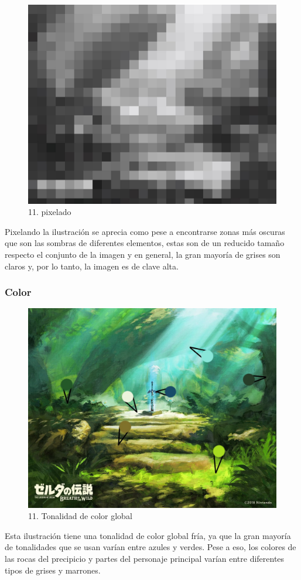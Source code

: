 \documentclass[12pt]{article}
\begin{document}
    \begin{figure}[H]
      \centering
      \includegraphics[scale=0.35]{images/Carlos/12/Pixelart.jpg}
      \caption{\small 11. pixelado}
    \end{figure}
    Pixelando la ilustración se aprecia como pese a encontrarse zonas más oscuras que son las sombras de diferentes elementos, estas son de un reducido tamaño respecto el conjunto de la imagen y en general, la gran mayoría de grises son claros y, por lo tanto, la imagen es de clave alta.

        \subsubsection{Color}
\begin{figure}[H]
      \centering
      \includegraphics[scale=0.35]{images/Carlos/12/Tonalidad.jpg}
      \caption{\small 11. Tonalidad de color global}
    \end{figure}
    Esta ilustración tiene una tonalidad de color global fría, ya que la gran mayoría de tonalidades que se usan varían entre azules y verdes. Pese a eso, los colores de las rocas del precipicio y partes del personaje principal varían entre diferentes tipos de grises y marrones.
\end{document}
